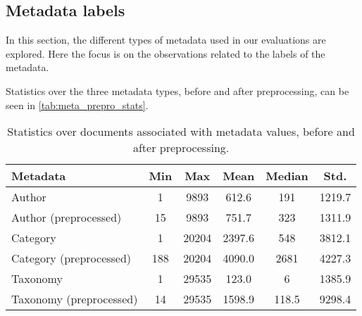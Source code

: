 \subsection{Metadata labels}\label{sec:appendix_meta_data}
In this section, the different types of metadata used in our evaluations are explored. 
Here the focus is on the observations related to the labels of the metadata.





Statistics over the three metadata types, before and after preprocessing, can be seen in \autoref{tab:meta_prepro_stats}.

\begin{table}
	\caption{Statistics over documents associated with metadata values, before and after preprocessing.}
	\label{tab:meta_prepro_stats}
	\centering
	\begin{tabular}{l | c | c | c | c | c}
		Metadata & Min & Max & Mean & Median & Std. \\
		\midrule
		Author & 1 & 9893 & 612.6 & 191 & 1219.7 \\
		Author (preprocessed) & 15 & 9893 & 751.7 & 323 & 1311.9 \\
		Category & 1 & 20204 & 2397.6 & 548 & 3812.1 \\
		Category (preprocessed) & 188 & 20204 & 4090.0 & 2681 & 4227.3 \\
		Taxonomy & 1 & 29535 & 123.0 & 6 & 1385.9 \\
		Taxonomy (preprocessed) & 14 & 29535 & 1598.9 & 118.5 & 9298.4 \\
	\end{tabular}
\end{table}
